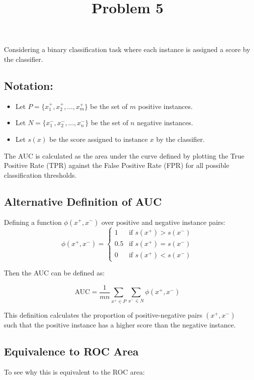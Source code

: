 \documentclass[12pt]{article}
\title{Problem 5}
\author{}
\date{}
\begin{document}
\maketitle
\thispagestyle{empty}

Considering a binary classification task where each instance is assigned a score by the classifier.

\subsection*{Notation:}
\begin{itemize}
  \item Let $P = \{x_1^+, x_2^+, \ldots, x_m^+\}$ be the set of $m$ positive instances.
  \item Let $N = \{x_1^-, x_2^-, \ldots, x_n^-\}$ be the set of $n$ negative instances.
  \item Let $s(x)$ be the score assigned to instance $x$ by the classifier.
\end{itemize}

The AUC is calculated as the area under the curve defined by plotting the True Positive 
Rate (TPR) against the False Positive Rate (FPR) for all possible classification thresholds.

\subsection*{Alternative Definition of AUC}

Defining a function $\phi(x^+, x^-)$ over positive and negative instance pairs:
\[
\phi(x^+, x^-) =
\begin{cases}
1 & \text{if } s(x^+) > s(x^-) \\
0.5 & \text{if } s(x^+) = s(x^-) \\
0 & \text{if } s(x^+) < s(x^-)
\end{cases}
\]

Then the AUC can be defined as:

\[
\text{AUC} = \frac{1}{mn} \sum_{x^+ \in P} \sum_{x^- \in N} \phi(x^+, x^-)
\]

This definition calculates the proportion of positive-negative pairs $(x^+, x^-)$ such that the positive instance has a higher score than the negative instance.

\subsection*{Equivalence to ROC Area}
To see why this is equivalent to the ROC area:
\end{document}
